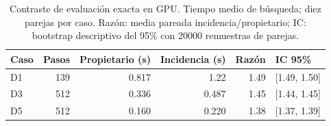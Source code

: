 \begin{table}[tbp]\centering\small
\caption{Contraste de evaluación exacta en GPU. Tiempo medio de búsqueda; diez parejas por caso. Razón: media pareada incidencia/propietario; IC: bootstrap descriptivo del 95\% con 20000 remuestras de parejas.}
\label{tab:owner-micro}
\begin{tabular}{lrrrrl}\toprule
Caso & Pasos & Propietario (s) & Incidencia (s) & Razón & IC 95\%\\\midrule
D1 & 139 & 0.817 & 1.22 & 1.49 & [1.49, 1.50]\\
D3 & 512 & 0.336 & 0.487 & 1.45 & [1.44, 1.45]\\
D5 & 512 & 0.160 & 0.220 & 1.38 & [1.37, 1.39]\\
\bottomrule\end{tabular}\end{table}
